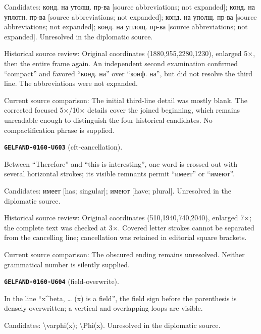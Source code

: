 Candidates: конд. на утолщ. пр-ва [source abbreviations; not expanded]; конд. на уплотн. пр-ва [source abbreviations; not expanded]; конд. на уполщ. пр-ва [source abbreviations; not expanded]; конд. на уплощ. пр-ва [source abbreviations; not expanded]. Unresolved in the diplomatic source.\par
Historical source review: Original coordinates (1880,955,2280,1230), enlarged 5×, then the entire frame again. An independent second examination confirmed “compact” and favored “конд. на” over “конф. на”, but did not resolve the third line. The abbreviations were not expanded.\par
Current source comparison: The initial third-line detail was mostly blank. The corrected focused 5×/10× details cover the joined beginning, which remains unreadable enough to distinguish the four historical candidates. No compactification phrase is supplied.\par\medskip
\par\noindent\leavevmode{}\label{GELFAND-0160-U603}\label{GELFAND-P001483:cft-cancellation}\textbf{\texttt{GELFAND-0160-U603}} (cft-cancellation).\nopagebreak[4]\par
Between “Therefore” and “this is interesting”, one word is crossed out with several horizontal strokes; its visible remnants permit “имеет” or “имеют”.\par
Candidates: имеет [has; singular]; имеют [have; plural]. Unresolved in the diplomatic source.\par
Historical source review: Original coordinates (510,1940,740,2040), enlarged 7×; the complete text was checked at 3×. Covered letter strokes cannot be separated from the cancelling line; cancellation was retained in editorial square brackets.\par
Current source comparison: The obscured ending remains unresolved. Neither grammatical number is silently supplied.\par\medskip
\par\noindent\leavevmode{}\label{GELFAND-0160-U604}\label{GELFAND-P001483:field-overwrite}\textbf{\texttt{GELFAND-0160-U604}} (field-overwrite).\nopagebreak[4]\par
In the line “x\textasciicircum{}beta, … (x) is a field”, the field sign before the parenthesis is densely overwritten; a vertical and overlapping loops are visible.\par
Candidates: \textbackslash{}varphi(x); \textbackslash{}Phi(x). Unresolved in the diplomatic source.\par

